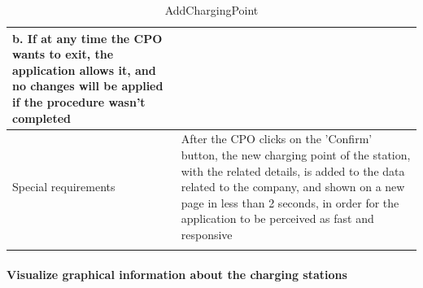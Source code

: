 \begin{center}
\begin{longtable}{p{4cm} p{11cm}}
                    b. If at any time the CPO wants to exit, the application allows it, and no changes will be applied if the procedure wasn't completed \\
     \hline
     Special requirements & After the CPO clicks on the 'Confirm' button, the new charging point of the station, with the related details, is added to the data related to the company, and shown on a new page in less than 2 seconds, in order for the application to be perceived as fast and responsive \\
     \hline
    \caption{AddChargingPoint}
    \label{tab:AddChargingPoint}
    \end{longtable}
\end{center}

\paragraph{Visualize graphical information about the charging stations}
